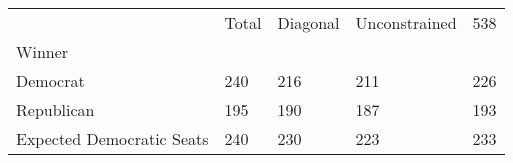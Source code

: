 \begin{tabular}{lllll}
\toprule
{} & Total & Diagonal & Unconstrained &  538 \\
Winner                             &       &          &               &      \\
\midrule
Democrat                           &   240 &      216 &           211 &  226 \\
Republican                         &   195 &      190 &           187 &  193 \\
\midrule Expected Democratic Seats &   240 &      230 &           223 &  233 \\
\bottomrule
\end{tabular}
